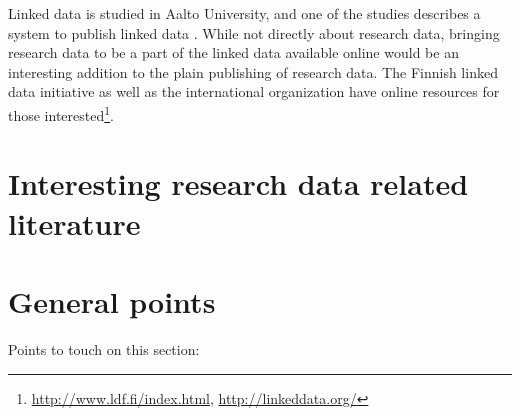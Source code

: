 Linked data is studied in Aalto University, and one of the studies describes
a system to publish linked data \cite{DBLP:conf/esws/FrosterusHL11}. While not
directly about research data, bringing research data to be a part of the linked
data available online would be an interesting addition to the plain publishing
of research data. The Finnish linked data initiative as well as the
international organization have online resources for those interested\footnote{
\url{http://www.ldf.fi/index.html}, \url{http://linkeddata.org/}}.

\iffalse

\section{Interesting research data related literature}

\section{General points}

Points to touch on this section:

